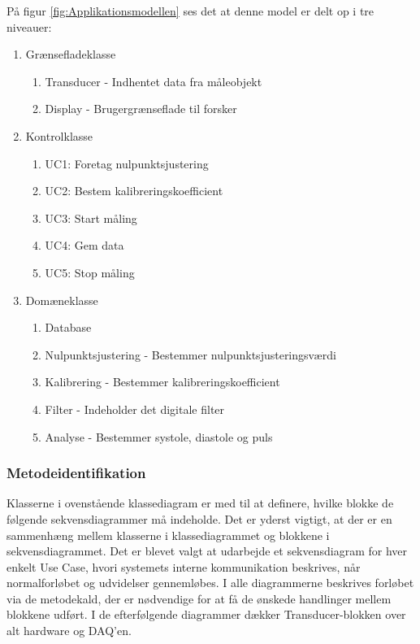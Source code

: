 På figur \ref{fig:Applikationsmodellen} ses det at denne model er delt op i tre niveauer:
\begin{enumerate}
\item Grænsefladeklasse
\begin{enumerate}
\item Transducer - Indhentet data fra måleobjekt
\item Display - Brugergrænseflade til forsker
\end{enumerate}
\item Kontrolklasse
\begin{enumerate}
\item UC1: Foretag nulpunktsjustering
\item UC2: Bestem kalibreringskoefficient
\item UC3: Start måling
\item UC4: Gem data
\item UC5: Stop måling
\end{enumerate}
\item Domæneklasse
\begin{enumerate}
\item Database
\item Nulpunktsjustering - Bestemmer nulpunktsjusteringsværdi
\item Kalibrering - Bestemmer kalibreringskoefficient
\item Filter - Indeholder det digitale filter
\item Analyse - Bestemmer systole, diastole og puls
\end{enumerate}
\end{enumerate}

\subsubsection{Metodeidentifikation}
Klasserne i ovenstående klassediagram er med til at definere, hvilke blokke de følgende sekvensdiagrammer må indeholde. Det er yderst vigtigt, at der er en sammenhæng mellem klasserne i klassediagrammet og blokkene i sekvensdiagrammet. Det er blevet valgt at udarbejde et sekvensdiagram for hver enkelt Use Case, hvori systemets interne kommunikation beskrives, når normalforløbet og udvidelser gennemløbes. I alle diagrammerne beskrives forløbet via de metodekald, der er nødvendige for at få de ønskede handlinger mellem blokkene udført. I de efterfølgende diagrammer dækker Transducer-blokken over alt hardware og DAQ'en.  

